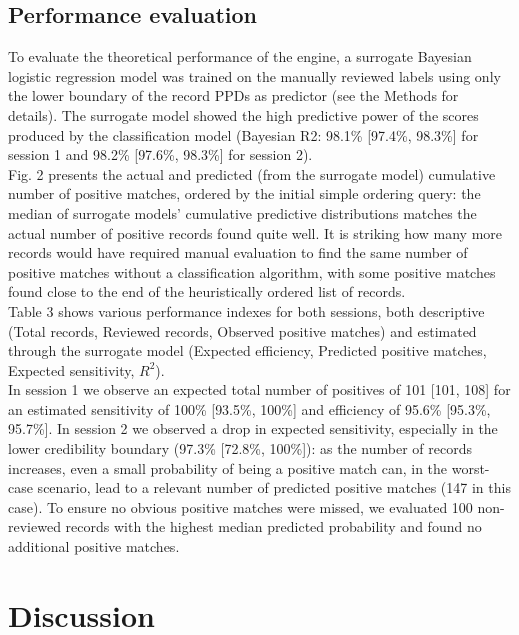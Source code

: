 \documentclass[]{bmcart}
\begin{document}
\subsection*{Performance evaluation}

To evaluate the theoretical performance of the engine, a surrogate
Bayesian logistic regression model was trained on the manually reviewed
labels using only the lower boundary of the record PPDs as predictor
(see the Methods for details). The surrogate model showed the high
predictive power of the scores produced by the classification model
(Bayesian R2: 98.1\% {[}97.4\%, 98.3\%{]} for session 1 and 98.2\%
{[}97.6\%, 98.3\%{]} for session 2).\\

Fig. 2 presents the actual and predicted (from the surrogate model)
cumulative number of positive matches, ordered by the initial simple
ordering query: the median of surrogate models' cumulative predictive
distributions matches the actual number of positive records found quite
well. It is striking how many more records would have required manual
evaluation to find the same number of positive matches without a
classification algorithm, with some positive matches found close to the
end of the heuristically ordered list of records.\\

Table 3 shows various performance indexes for both sessions, both
descriptive (Total records, Reviewed records, Observed positive matches)
and estimated through the surrogate model (Expected efficiency,
Predicted positive matches, Expected sensitivity, \(R^2\)).\\
In session 1 we observe an expected total number of positives of 101
{[}101, 108{]} for an estimated sensitivity of 100\% {[}93.5\%, 100\%{]}
and efficiency of 95.6\% {[}95.3\%, 95.7\%{]}. In session 2 we observed
a drop in expected sensitivity, especially in the lower credibility
boundary (97.3\% {[}72.8\%, 100\%{]}): as the number of records
increases, even a small probability of being a positive match can, in
the worst-case scenario, lead to a relevant number of predicted positive
matches (147 in this case). To ensure no obvious positive matches were
missed, we evaluated 100 non-reviewed records with the highest median
predicted probability and found no additional positive matches.\\

\section*{Discussion}
\end{document}
